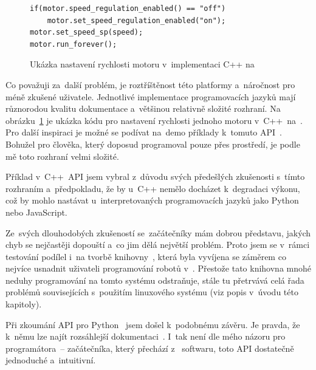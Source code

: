 \begin{figure}[H] 
	\begin{verbatim}
if(motor.speed_regulation_enabled() == "off")
    motor.set_speed_regulation_enabled("on");
motor.set_speed_sp(speed);
motor.run_forever();
	\end{verbatim}
	\caption{Ukázka nastavení rychlosti motoru v~implementaci C++ na \evThreeDev}
	\label{src:ev3dev-lang-cpp_drive-test}
\end{figure}

Co považuji za~další problém, je roztříštěnost této platformy a~náročnost pro méně zkušené uživatele. 
Jednotlivé implementace programovacích jazyků mají různorodou kvalitu dokumentace a~většinou relativně složité rozhraní. 
Na obrázku~\ref{src:ev3dev-lang-cpp_drive-test} je ukázka kódu pro nastavení rychlosti jednoho motoru v~C++~na~\evThreeDev{}. 
Pro další inspiraci je možné se podívat na~demo příklady k~tomuto API~\cite{legoMindstormsEV3_ev3dev-lang-cpp_drive-test}.
Bohužel pro člověka, který doposud programoval pouze přes \lego{} prostředí, je podle mě toto rozhraní velmi složité.

Příklad v~C++~API jsem vybral z~důvodu svých předešlých zkušenosti s~tímto rozhraním a~předpokladu, že by u~C++ nemělo docházet k~degradaci výkonu, což by mohlo nastávat u~interpretovaných programovacích jazyků jako Python nebo JavaScript.

Ze~svých dlouhodobých zkušeností se~začátečníky mám dobrou představu, jakých chyb se nejčastěji dopouští a~co jim dělá největší problém.
Proto jsem se v~rámci testování \evThreeDev{} podílel i~na tvorbě knihovny~\cite{legoMindstormsEV3_ev3dev_RB-ev3dev-cpp-lib}, která byla vyvíjena se záměrem co nejvíce usnadnit uživateli programování robotů v~\evThreeDev{}. 
Přestože tato knihovna mnohé neduhy programování na tomto systému odstraňuje, stále tu přetrvává celá řada problémů souvisejících s~použitím linuxového systému (viz popis v~úvodu této kapitoly).


Při zkoumání API pro Python~\cite{legoMindstormsEV3_ev3dev-lang-python} jsem došel k~podobnému závěru. 
Je pravda, že k~němu lze najít rozsáhlejší dokumentaci~\cite{legoMindstormsEV3_ev3dev-lang-python-docs}. 
I~tak není dle mého názoru pro programátora~-- začátečníka, který přechází z~\lego{}  softwaru, toto API dostatečně jednoduché a~intuitivní.


